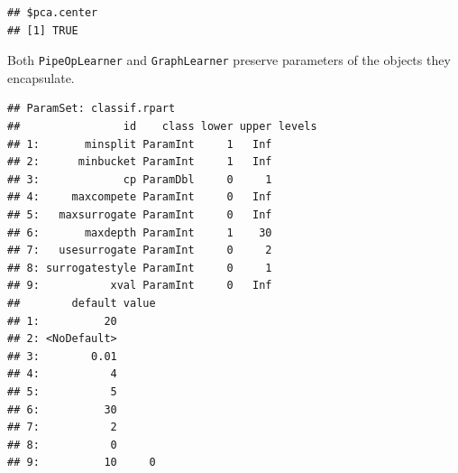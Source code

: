 \documentclass[]{article}
\newenvironment{Shaded}{\begin{snugshade}}{\end{snugshade}}
\newcommand{\KeywordTok}[1]{\textcolor[rgb]{0.13,0.29,0.53}{\textbf{#1}}}
\newcommand{\NormalTok}[1]{#1}
\newcommand{\OperatorTok}[1]{\textcolor[rgb]{0.81,0.36,0.00}{\textbf{#1}}}
\newcommand{\StringTok}[1]{\textcolor[rgb]{0.31,0.60,0.02}{#1}}
\renewenvironment{Shaded} {\begin{snugshade}\small} {\end{snugshade}}
\begin{document}
\begin{Shaded}
\end{Shaded}

\begin{verbatim}
## $pca.center
## [1] TRUE
\end{verbatim}

Both \texttt{PipeOpLearner} and \texttt{GraphLearner} preserve parameters of the objects they encapsulate.

\begin{Shaded}
\end{Shaded}

\begin{verbatim}
## ParamSet: classif.rpart
##                id    class lower upper levels
## 1:       minsplit ParamInt     1   Inf       
## 2:      minbucket ParamInt     1   Inf       
## 3:             cp ParamDbl     0     1       
## 4:     maxcompete ParamInt     0   Inf       
## 5:   maxsurrogate ParamInt     0   Inf       
## 6:       maxdepth ParamInt     1    30       
## 7:   usesurrogate ParamInt     0     2       
## 8: surrogatestyle ParamInt     0     1       
## 9:           xval ParamInt     0   Inf       
##        default value
## 1:          20      
## 2: <NoDefault>      
## 3:        0.01      
## 4:           4      
## 5:           5      
## 6:          30      
## 7:           2      
## 8:           0      
## 9:          10     0
\end{verbatim}

\begin{Shaded}
\end{Shaded}
\end{document}
